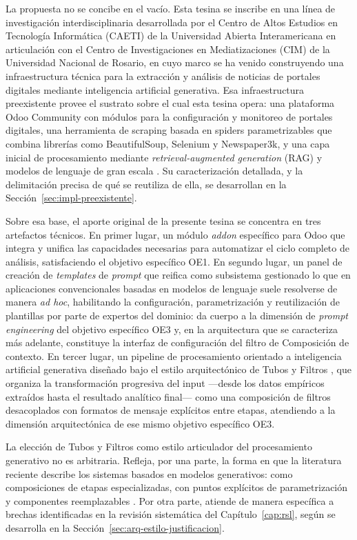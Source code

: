 \documentclass[12pt]{report}
\begin{document}
La propuesta no se concibe en el vacío. Esta tesina se inscribe en una línea de investigación interdisciplinaria desarrollada por el Centro de Altos Estudios en Tecnología Informática (CAETI) de la Universidad Abierta Interamericana en articulación con el Centro de Investigaciones en Mediatizaciones (CIM) de la Universidad Nacional de Rosario, en cuyo marco se ha venido construyendo una infraestructura técnica para la extracción y análisis de noticias de portales digitales mediante inteligencia artificial generativa. Esa infraestructura preexistente provee el sustrato sobre el cual esta tesina opera: una plataforma Odoo Community con módulos para la configuración y monitoreo de portales digitales, una herramienta de scraping basada en spiders parametrizables que combina librerías como BeautifulSoup, Selenium y Newspaper3k, y una capa inicial de procesamiento mediante \textit{retrieval-augmented generation} (RAG) y modelos de lenguaje de gran escala \citep{raimondo:2024}. Su caracterización detallada, y la delimitación precisa de qué se reutiliza de ella, se desarrollan en la Sección~\ref{sec:impl-preexistente}.

Sobre esa base, el aporte original de la presente tesina se concentra en tres artefactos técnicos. En primer lugar, un módulo \textit{addon} específico para Odoo que integra y unifica las capacidades necesarias para automatizar el ciclo completo de análisis, satisfaciendo el objetivo específico OE1. En segundo lugar, un panel de creación de \textit{templates} de \textit{prompt} que reifica como subsistema gestionado lo que en aplicaciones convencionales basadas en modelos de lenguaje suele resolverse de manera \textit{ad hoc}, habilitando la configuración, parametrización y reutilización de plantillas por parte de expertos del dominio: da cuerpo a la dimensión de \textit{prompt engineering} del objetivo específico OE3 y, en la arquitectura que se caracteriza más adelante, constituye la interfaz de configuración del filtro de Composición de contexto. En tercer lugar, un pipeline de procesamiento orientado a inteligencia artificial generativa diseñado bajo el estilo arquitectónico de Tubos y Filtros \citep{garlanshaw:1994, shawgarlan:1996}, que organiza la transformación progresiva del input ---desde los datos empíricos extraídos hasta el resultado analítico final--- como una composición de filtros desacoplados con formatos de mensaje explícitos entre etapas, atendiendo a la dimensión arquitectónica de ese mismo objetivo específico OE3.

La elección de Tubos y Filtros como estilo articulador del procesamiento generativo no es arbitraria. Refleja, por una parte, la forma en que la literatura reciente describe los sistemas basados en modelos generativos: como composiciones de etapas especializadas, con puntos explícitos de parametrización y componentes reemplazables \citep{wang:2024, xi:2023}. Por otra parte, atiende de manera específica a brechas identificadas en la revisión sistemática del Capítulo~\ref{cap:rsl}, según se desarrolla en la Sección~\ref{sec:arq-estilo-justificacion}.
\end{document}
